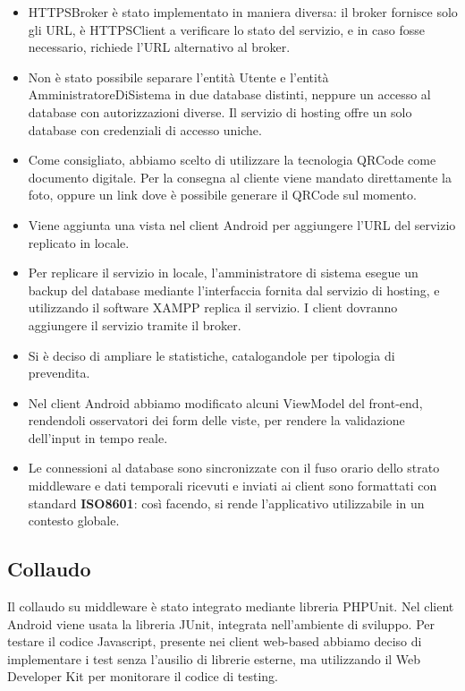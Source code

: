 \documentclass[a4paper]{article}
\begin{document}
\begin{itemize}
    \item HTTPSBroker è stato implementato in maniera diversa: il broker fornisce solo gli URL, è HTTPSClient a verificare lo stato del servizio, e in caso fosse necessario, richiede l'URL alternativo al broker.
    \item Non è stato possibile separare l'entità Utente e l'entità AmministratoreDiSistema in due database distinti, neppure un accesso al database con autorizzazioni diverse. Il servizio di hosting offre un solo database con credenziali di accesso uniche.
    \item Come consigliato, abbiamo scelto di utilizzare la tecnologia QRCode come documento digitale. Per la consegna al cliente viene mandato direttamente la foto, oppure un link dove è possibile generare il QRCode sul momento.
    \item Viene aggiunta una vista nel client Android per aggiungere l'URL del servizio replicato in locale.
    \item Per replicare il servizio in locale, l'amministratore di sistema esegue un backup del database mediante l'interfaccia fornita dal servizio di hosting, e utilizzando il software XAMPP replica il servizio. I client dovranno aggiungere il servizio tramite il broker.
    \item Si è deciso di ampliare le statistiche, catalogandole per tipologia di prevendita.
    \item Nel client Android abbiamo modificato alcuni ViewModel del front-end, rendendoli osservatori dei form delle viste, per rendere la validazione dell'input in tempo reale.
    \item Le connessioni al database sono sincronizzate con il fuso orario dello strato middleware e dati temporali ricevuti e inviati ai client sono formattati con standard \textbf{ISO8601}: così facendo, si rende l'applicativo utilizzabile in un contesto globale.
\end{itemize}

\subsection{Collaudo}

Il collaudo su middleware è stato integrato mediante libreria PHPUnit. Nel client Android viene usata la libreria JUnit, integrata nell'ambiente di sviluppo. Per testare il codice Javascript, presente nei client web-based abbiamo deciso di implementare i test senza l'ausilio di librerie esterne, ma utilizzando il Web Developer Kit per monitorare il codice di testing.
\end{document}
